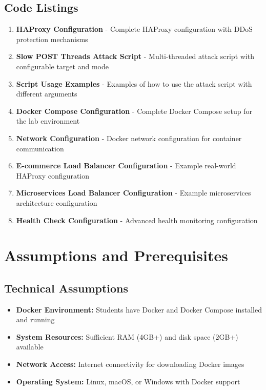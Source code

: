 \documentclass[12pt]{article}
\begin{document}
\subsection{Code Listings}
\begin{enumerate}
    \item \textbf{HAProxy Configuration} - Complete HAProxy configuration with DDoS protection mechanisms
    \item \textbf{Slow POST Threads Attack Script} - Multi-threaded attack script with configurable target and mode
    \item \textbf{Script Usage Examples} - Examples of how to use the attack script with different arguments
    \item \textbf{Docker Compose Configuration} - Complete Docker Compose setup for the lab environment
    \item \textbf{Network Configuration} - Docker network configuration for container communication
    \item \textbf{E-commerce Load Balancer Configuration} - Example real-world HAProxy configuration
    \item \textbf{Microservices Load Balancer Configuration} - Example microservices architecture configuration
    \item \textbf{Health Check Configuration} - Advanced health monitoring configuration
\end{enumerate}

\section{Assumptions and Prerequisites}

\subsection{Technical Assumptions}
\begin{itemize}
    \item \textbf{Docker Environment:} Students have Docker and Docker Compose installed and running
    \item \textbf{System Resources:} Sufficient RAM (4GB+) and disk space (2GB+) available
    \item \textbf{Network Access:} Internet connectivity for downloading Docker images
    \item \textbf{Operating System:} Linux, macOS, or Windows with Docker support
\end{itemize}
\end{document}
